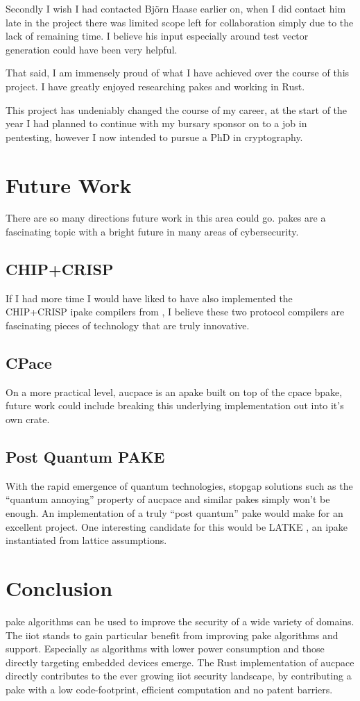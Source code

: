 Secondly I wish I had contacted Bj\"orn Haase earlier on, when I did contact him late in the project there was limited scope left for collaboration simply due to the lack of remaining time.
I believe his input especially around test vector generation could have been very helpful.

That said, I am immensely proud of what I have achieved over the course of this project.
I have greatly enjoyed researching \glspl{pake} and working in Rust.

This project has undeniably changed the course of my career, at the start of the year I had planned to continue with my bursary sponsor on to a job in pentesting, however I now intended to pursue a PhD in cryptography.

\section{Future Work}
There are so many directions future work in this area could go.
\glspl{pake} are a fascinating topic with a bright future in many areas of cybersecurity.

\subsection{CHIP+CRISP}
If I had more time I would have liked to have also implemented the CHIP+CRISP \gls{ipake} compilers from \citeauthor{chip+crisp}, I believe these two protocol compilers are fascinating pieces of technology that are truly innovative.

\subsection{CPace}
On a more practical level, \gls{aucpace} is an \gls{apake} built on top of the \gls{cpace} \gls{bpake}, future work could include breaking this underlying implementation out into it's own crate.

\subsection{Post Quantum PAKE}
With the rapid emergence of quantum technologies, stopgap solutions such as the \enquote{quantum annoying} property of \gls{aucpace} and similar \glspl{pake} simply won't be enough.
An implementation of a truly \enquote{post quantum} \gls{pake} would make for an excellent project.
One interesting candidate for this would be LATKE \cite{latke}, an \gls{ipake} instantiated from lattice assumptions.

\section{Conclusion}
\gls{pake} algorithms can be used to improve the security of a wide variety of domains.
The \gls{iiot} stands to gain particular benefit from improving \gls{pake} algorithms and support.
Especially as algorithms with lower power consumption and those directly targeting embedded devices emerge.
The Rust implementation of \gls{aucpace} directly contributes to the ever growing \gls{iiot} security landscape, by contributing a \gls{pake} with a low code-footprint, efficient computation and no patent barriers.
